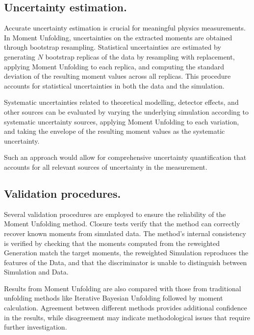     \subsection{Uncertainty estimation.}
        Accurate uncertainty estimation is crucial for meaningful physics measurements.
        In Moment Unfolding, uncertainties on the extracted moments are obtained through bootstrap resampling.
        Statistical uncertainties are estimated by generating $N$ bootstrap replicas of the data by resampling with replacement,
        applying Moment Unfolding to each replica, and
        computing the standard deviation of the resulting moment values across all replicas.
        This procedure accounts for statistical uncertainties in both the data and the simulation.
        
        Systematic uncertainties related to theoretical modelling, detector effects, and other sources can be evaluated by
        varying the underlying simulation according to systematic uncertainty sources, applying Moment Unfolding to each variation, and
        taking the envelope of the resulting moment values as the systematic uncertainty.

        Such an approach would allow for comprehensive uncertainty quantification that accounts for all relevant sources of uncertainty in the measurement.
    \subsection{Validation procedures.}
        Several validation procedures are employed to ensure the reliability of the Moment Unfolding method.
        Closure tests verify that the method can correctly recover known moments from simulated data.
        The method's internal consistency is verified by checking that the moments computed from the reweighted Generation match the target moments,
        the reweighted Simulation reproduces the features of the Data, and
        that the discriminator is unable to distinguish between Simulation and Data.
        
        Results from Moment Unfolding are also compared with those from traditional unfolding methods like Iterative Bayesian Unfolding followed by moment calculation.
        Agreement between different methods provides additional confidence in the results, while disagreement may indicate methodological issues that require further investigation.
